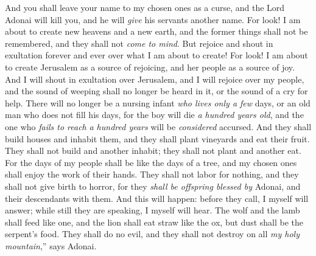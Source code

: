 \begin{biblechapter}
\verse And you shall leave your name to my chosen ones as a curse, 
and the Lord Adonai will kill you, and he will \textit{give} his servants another name.
 For look! I am about to create new heavens and a new earth, 
and the former things shall not be remembered, 
and they shall not \textit{come to mind}.
\verse But rejoice and shout in exultation forever and ever over what I am about to create! 
For look! I am about to create Jerusalem as a source of rejoicing, 
and her people as a source of joy.
\verse And I will shout in exultation over Jerusalem, 
and I will rejoice over my people, 
and the sound of weeping shall no longer be heard in it, 
or the sound of a cry for help.
\verse There will no longer be a nursing infant \textit{who lives only a few} days, 
or an old man who does not fill his days, 
for the boy will die \textit{a hundred years old}, 
and the one who \textit{fails to reach} \textit{a hundred years} will be \textit{considered} accursed.
\verse And they shall build houses and inhabit them, 
and they shall plant vineyards and eat their fruit.
\verse They shall not build and another inhabit; 
they shall not plant and another eat. 
For the days of my people shall be like the days of a tree, 
and my chosen ones shall enjoy the work of their hands.
\verse They shall not labor for nothing, 
and they shall not give birth to horror, 
for they \textit{shall be offspring blessed by} Adonai, 
and their descendants with them.
\verse And this will happen: before they call, I myself will answer; 
while still they are speaking, I myself will hear.
\verse The wolf and the lamb shall feed like one, 
and the lion shall eat straw like the ox, 
but dust shall be the serpent’s food. 
They shall do no evil, 
and they shall not destroy on all \textit{my holy mountain},” says Adonai.
\end{biblechapter}

